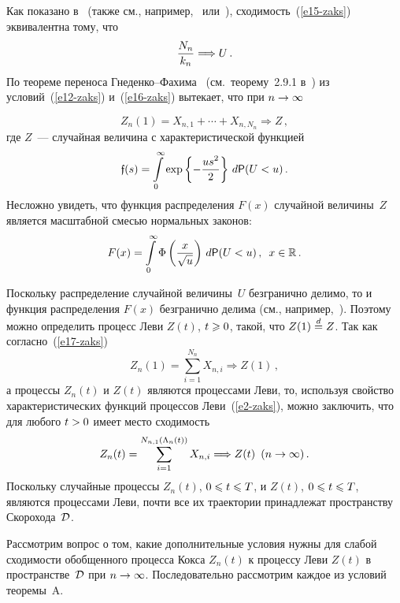 \begin{multicols}{2}
Как показано в~\cite{GnedenkoKorolev1996} (также см., например,~\cite{BeningKorolev2002}
или~\cite{KorolevBeningShorgin2011}),
сходимость~(\ref{e15-zaks}) эквивалентна тому, что
\begin{equation}
\displaystyle\frac{\displaystyle N_n\mathstrut}{\displaystyle k_n\mathstrut}\Longrightarrow U\,.\label{e16-zaks}
\end{equation}
По теореме переноса Гне\-ден\-ко--Фа\-хи\-ма~\cite{GnedenkoFahim1969} (см.\
теорему~2.9.1 в~\cite{KorolevBeningShorgin2011}) из условий~(\ref{e12-zaks}) и~(\ref{e16-zaks})
вытекает, что при $n\hm\to\infty$

\noindent
\begin{equation}
Z_n(1)=X_{n,1}+\cdots +X_{n,N_n}\Longrightarrow Z\,,\label{e17-zaks}
\end{equation}
где $Z$~--- случайная величина с характеристической функцией
$$
\mathfrak{f}(s)=\int\limits_{0}^{\infty}\exp\left\{-\displaystyle\frac{\displaystyle us^2\mathstrut}{\displaystyle 2\mathstrut}\right\}\,d{\sf P}(U<u)\,.
$$
Несложно увидеть, что функция распределения $F(x)$ случайной
величины~$Z$ является масштабной смесью нормальных законов:
$$
F(x)=\int\limits_{0}^{\infty}\Phi\left(\displaystyle\frac{\displaystyle x\mathstrut}{\displaystyle \sqrt{u}\mathstrut}\right)\,d{\sf P}(U<u)\,,\enskip
x\in\mathbb{R}\,.
$$

Поскольку распределение случайной величины~$U$ безгранично делимо,
то и функция распределения $F(x)$ безгранично делима (см., например,~\cite{Feller1984}).
Поэтому можно определить процесс Леви $Z(t)$,
$t\hm\geqslant0$, такой, что $Z(1)\stackrel{d}{=} Z$. Так как согласно~(\ref{e17-zaks})
$$
Z_n(1)=\sum\limits_{i=1}^{N_n}X_{n,i}\Longrightarrow Z(1)\,,
$$
а процессы $Z_n(t)$ и $Z(t)$ являются процессами Леви, то, используя
свойство характеристических функций процессов Леви~(\ref{e2-zaks}), можно
заключить, что для любого $t\hm>0$ имеет место сходимость
\begin{equation}
Z_n(t)=\sum\limits_{i=1}^{N_{n,1}(\Lambda_n(t))}X_{n,i}\Longrightarrow Z(t)
\enskip (n\to\infty)\,.\label{e18-zaks}
\end{equation}
Поскольку случайные процессы $Z_n(t)$, $0\hm\leqslant t\hm\leqslant T$, и $Z(t)$,
$0\hm\leqslant t\hm\leqslant T$, являются процессами Леви, почти все их траектории
принадлежат пространству Скорохода~${\cal D}$.

Рассмотрим вопрос о том, какие дополнительные условия нужны для
слабой сходимости обобщенного процесса Кокса $Z_n(t)$ к процессу
Леви $Z(t)$ в пространстве~${\cal D}$ при $n\hm\to\infty$.
Последовательно рассмотрим каждое из условий теоремы~A.


\end{multicols}
